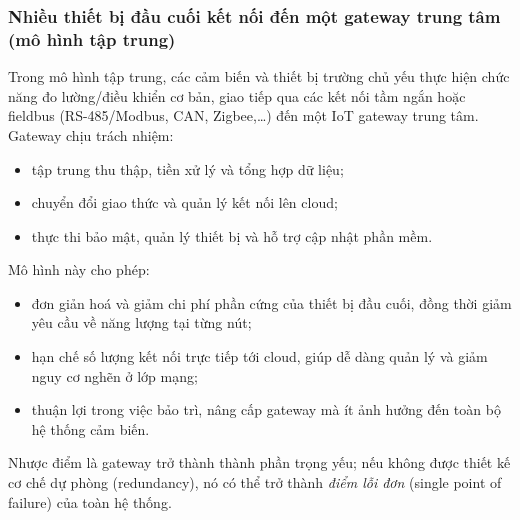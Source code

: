             \subsubsection*{Nhiều thiết bị đầu cuối kết nối đến một gateway trung tâm (mô hình tập trung)}
                Trong mô hình tập trung, các cảm biến và thiết bị trường chủ yếu thực hiện chức năng đo lường/điều khiển cơ bản, giao tiếp qua các kết nối tầm ngắn hoặc fieldbus (RS-485/Modbus, CAN, Zigbee,\dots) đến một IoT gateway trung tâm. Gateway chịu trách nhiệm:
                \begin{itemize}
                    \item tập trung thu thập, tiền xử lý và tổng hợp dữ liệu;
                    \item chuyển đổi giao thức và quản lý kết nối lên cloud;
                    \item thực thi bảo mật, quản lý thiết bị và hỗ trợ cập nhật phần mềm.
                \end{itemize}
                
                Mô hình này cho phép:
                \begin{itemize}
                    \item đơn giản hoá và giảm chi phí phần cứng của thiết bị đầu cuối, đồng thời giảm yêu cầu về năng lượng tại từng nút;
                    \item hạn chế số lượng kết nối trực tiếp tới cloud, giúp dễ dàng quản lý và giảm nguy cơ nghẽn ở lớp mạng;
                    \item thuận lợi trong việc bảo trì, nâng cấp gateway mà ít ảnh hưởng đến toàn bộ hệ thống cảm biến.
                \end{itemize}
                
                Nhược điểm là gateway trở thành thành phần trọng yếu; nếu không được thiết kế cơ chế dự phòng (redundancy), nó có thể trở thành \emph{điểm lỗi đơn} (single point of failure) của toàn hệ thống.
